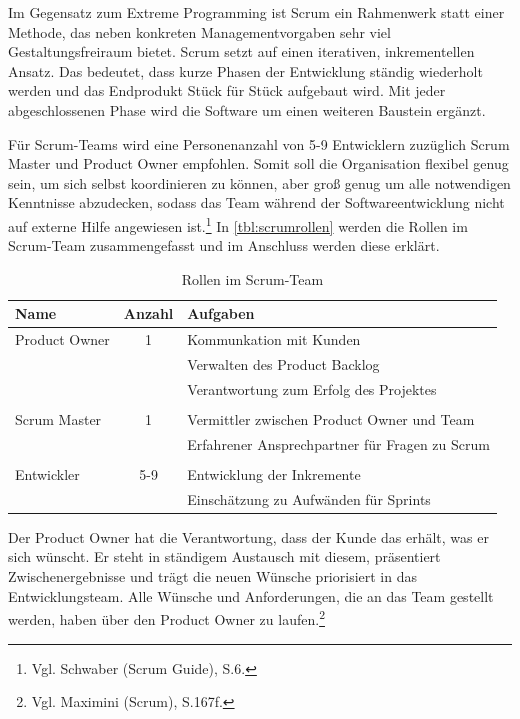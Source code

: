             Im Gegensatz zum Extreme Programming ist Scrum ein Rahmenwerk statt einer Methode, das neben konkreten Managementvorgaben sehr viel Gestaltungsfreiraum bietet. Scrum setzt auf einen iterativen, inkrementellen Ansatz. Das bedeutet, dass kurze Phasen der Entwicklung ständig wiederholt werden und das Endprodukt Stück für Stück aufgebaut wird. Mit jeder abgeschlossenen Phase wird die Software um einen weiteren Baustein ergänzt.

            Für Scrum-Teams wird eine Personenanzahl von 5-9 Entwicklern zuzüglich Scrum Master und Product Owner empfohlen. Somit soll die Organisation flexibel genug sein, um sich selbst koordinieren zu können, aber groß genug um alle notwendigen Kenntnisse abzudecken, sodass das Team während der Softwareentwicklung nicht auf externe Hilfe angewiesen ist.\footnote{Vgl. Schwaber (Scrum Guide), S.6.} In \autoref{tbl:scrumrollen} werden die Rollen im Scrum-Team zusammengefasst und im Anschluss werden diese erklärt.

            \begin{table}[!htbp]
            \begin{tabularx}{\textwidth}{|l|c|X|}
                \hline
                Name & Anzahl & Aufgaben \\
                \hline
                Product Owner & 1 & Kommunkation mit Kunden \\
                && Verwalten des Product Backlog \\
                && Verantwortung zum Erfolg des Projektes \\
                &&\\
                Scrum Master & 1 & Vermittler zwischen Product Owner und Team \\
                && Erfahrener Ansprechpartner für Fragen zu Scrum \\
                && \\
                Entwickler & 5-9 & Entwicklung der Inkremente \\
                && Einschätzung zu Aufwänden für Sprints \\
                \hline
            \end{tabularx}
            \caption{Rollen im Scrum-Team}
            \label{tbl:scrumrollen}
            \end{table}

            Der Product Owner hat die Verantwortung, dass der Kunde das erhält, was er sich wünscht. Er steht in ständigem Austausch mit diesem, präsentiert Zwischenergebnisse und trägt die neuen Wünsche priorisiert in das Entwicklungsteam. Alle Wünsche und Anforderungen, die an das Team gestellt werden, haben über den Product Owner zu laufen.\footnote{Vgl. Maximini (Scrum), S.167f.}

